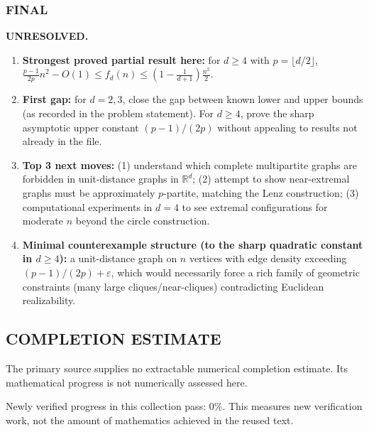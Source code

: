 \subsubsection*{FINAL}
\textbf{UNRESOLVED.}
\begin{enumerate}
\item[(i)] \textbf{Strongest proved partial result here:} for \(d\ge 4\) with \(p=\lfloor d/2\rfloor\),
\(\frac{p-1}{2p}n^2-O(1)\le f_d(n)\le \left(1-\frac{1}{d+1}\right)\frac{n^2}{2}\).
\item[(ii)] \textbf{First gap:} for \(d=2,3\), close the gap between known lower and upper bounds (as recorded in the problem statement). For \(d\ge 4\), prove the sharp asymptotic upper constant \((p-1)/(2p)\) without appealing to results not already in the file.
\item[(iii)] \textbf{Top 3 next moves:}
(1) understand which complete multipartite graphs are forbidden in unit-distance graphs in \(\mathbb{R}^d\);
(2) attempt to show near-extremal graphs must be approximately \(p\)-partite, matching the Lenz construction;
(3) computational experiments in \(d=4\) to see extremal configurations for moderate \(n\) beyond the circle construction.
\item[(iv)] \textbf{Minimal counterexample structure (to the sharp quadratic constant in \(d\ge 4\)):}
a unit-distance graph on \(n\) vertices with edge density exceeding \((p-1)/(2p)+\varepsilon\), which would necessarily force a rich family of geometric constraints (many large cliques/near-cliques) contradicting Euclidean realizability.
\end{enumerate}




\subsection*{COMPLETION ESTIMATE}
The primary source supplies no extractable numerical completion estimate. Its mathematical progress is not numerically assessed here.

Newly verified progress in this collection pass: $0\%$. This measures new verification work, not the amount of mathematics achieved in the reused text.
